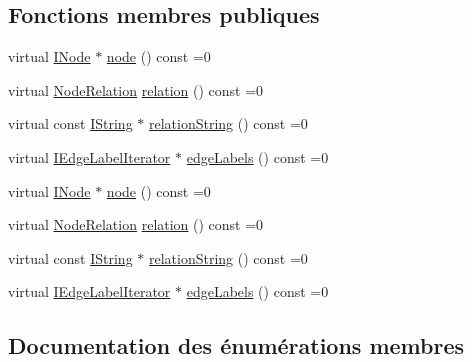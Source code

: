 \subsection*{Fonctions membres publiques}
\begin{DoxyCompactItemize}
\item 
virtual \hyperlink{class_i_node}{I\+Node} $\ast$ \hyperlink{class_i_child_node_a99671a1a6f939eb3c6da1b91e37e8d21}{node} () const  =0
\item 
virtual \hyperlink{class_i_child_node_a8f1206e7dd6aba7e62a7e50e2edf8ee2}{Node\+Relation} \hyperlink{class_i_child_node_a46683ceccc19788ad9b04e5f5a2d08bd}{relation} () const  =0
\item 
virtual const \hyperlink{class_i_string}{I\+String} $\ast$ \hyperlink{class_i_child_node_a8504bdd5fc100371c3b00bb560779122}{relation\+String} () const  =0
\item 
virtual \hyperlink{class_i_edge_label_iterator}{I\+Edge\+Label\+Iterator} $\ast$ \hyperlink{class_i_child_node_acbb0bf7a5c914b47274f08e67b41df4b}{edge\+Labels} () const  =0
\item 
virtual \hyperlink{class_i_node}{I\+Node} $\ast$ \hyperlink{class_i_child_node_a99671a1a6f939eb3c6da1b91e37e8d21}{node} () const  =0
\item 
virtual \hyperlink{class_i_child_node_a8f1206e7dd6aba7e62a7e50e2edf8ee2}{Node\+Relation} \hyperlink{class_i_child_node_a46683ceccc19788ad9b04e5f5a2d08bd}{relation} () const  =0
\item 
virtual const \hyperlink{class_i_string}{I\+String} $\ast$ \hyperlink{class_i_child_node_a8504bdd5fc100371c3b00bb560779122}{relation\+String} () const  =0
\item 
virtual \hyperlink{class_i_edge_label_iterator}{I\+Edge\+Label\+Iterator} $\ast$ \hyperlink{class_i_child_node_acbb0bf7a5c914b47274f08e67b41df4b}{edge\+Labels} () const  =0
\end{DoxyCompactItemize}


\subsection{Documentation des énumérations membres}
\hypertarget{class_i_child_node_a8f1206e7dd6aba7e62a7e50e2edf8ee2}{}
